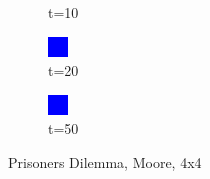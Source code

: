 \documentclass[a4paper, 11pt]{article}
\begin{document}
\begin{figure}[H]
\begin{subfigure}{.16\textwidth}
  \caption{t=10}
\end{subfigure}%
\begin{subfigure}{.16\textwidth}
  \centering
  \includegraphics[width=0.9\linewidth]{PRISONERS_DILEMMA_MOORE_4x4_t20}
  \caption{t=20}
\end{subfigure}%
\begin{subfigure}{.16\textwidth}
  \centering
  \includegraphics[width=0.9\linewidth]{PRISONERS_DILEMMA_MOORE_4x4_t50}
  \caption{t=50}
\end{subfigure}
\caption{Prisoners Dilemma, Moore, 4x4}
\end{figure}
\end{document}
